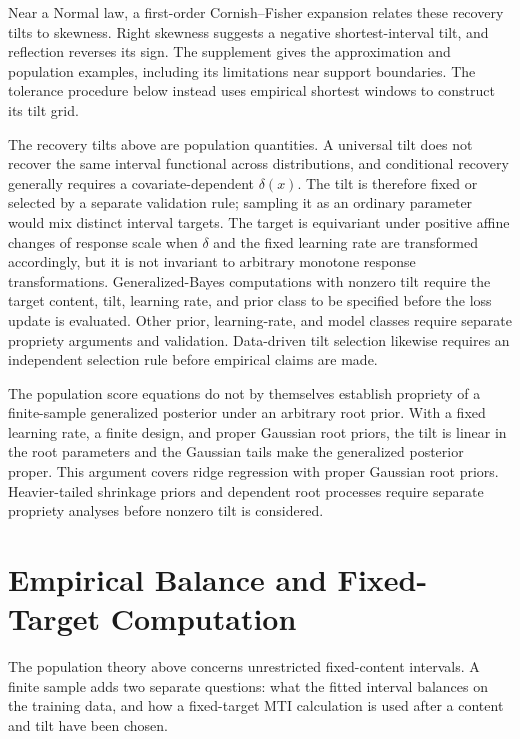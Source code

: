 \documentclass[11pt]{article}
\numberwithin{equation}{section}
\begin{document}
Near a Normal law, a first-order Cornish--Fisher expansion
\citep{CornishFisher1937} relates these recovery tilts to skewness. Right
skewness suggests a negative shortest-interval tilt, and reflection reverses
its sign. The supplement gives the approximation and population examples,
including its limitations near support boundaries. The tolerance procedure
below instead uses empirical shortest windows to construct its tilt grid.

The recovery tilts above are population quantities. A universal tilt does not
recover the same interval functional across distributions, and conditional
recovery generally requires a covariate-dependent \(\delta(x)\). The tilt is
therefore fixed or selected by a separate validation rule; sampling
it as an ordinary parameter would mix distinct interval targets. The target is
equivariant under positive affine changes of response scale when \(\delta\)
and the fixed learning rate are transformed accordingly, but it is not
invariant to arbitrary monotone response transformations. Generalized-Bayes
computations with nonzero tilt require the target content, tilt, learning rate,
and prior class to be specified before the loss update is evaluated. Other
prior, learning-rate, and model classes require separate propriety arguments and
validation. Data-driven tilt selection likewise requires an independent
selection rule before empirical claims are made.

The population score equations do not by themselves establish propriety of a
finite-sample generalized posterior under an arbitrary root prior. With a
fixed learning rate, a finite design, and proper Gaussian root priors, the tilt
is linear in the root parameters and the Gaussian tails make the generalized
posterior proper. This argument covers ridge regression with proper Gaussian
root priors. Heavier-tailed shrinkage priors and dependent root processes
require separate propriety analyses before nonzero tilt is considered.


\section{Empirical Balance and Fixed-Target Computation}
\label{sec:static-theory-statements}

The population theory above concerns unrestricted fixed-content intervals. A
finite sample adds two separate questions: what the fitted interval balances on
the training data, and how a fixed-target MTI calculation is used after a
content and tilt have been chosen.
\end{document}

